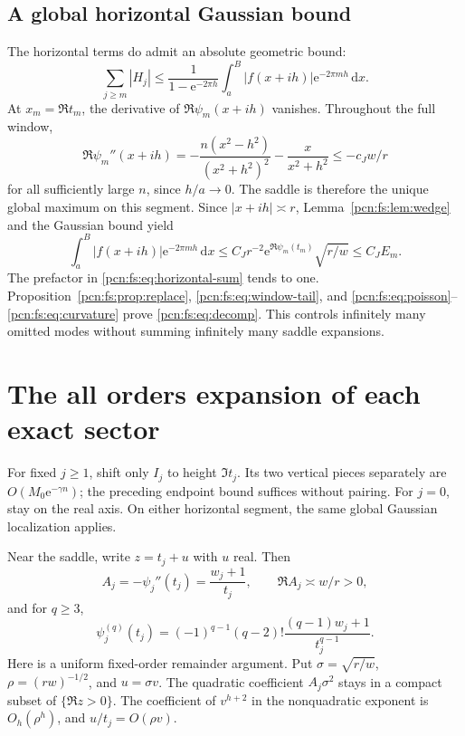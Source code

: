 \documentclass[11pt,letterpaper]{article}
\theoremstyle{remark}\newtheorem{remark}[theorem]{Remark}
\newcommand{\dd}{\,\mathrm d}
\newcommand{\ee}{\mathrm e}
\begin{document}
\subsection{A global horizontal Gaussian bound}
The horizontal terms do admit an absolute geometric bound:
\begin{equation}\label{pcn:fs:eq:horizontal-sum}
 \sum_{j\ge m}|H_j|
 \le\frac1{1-\ee^{-2\pi h}}
       \int_a^B|f(x+ih)|\ee^{-2\pi mh}\dd x.
\end{equation}
At $x_m=\Re t_m$, the derivative of $\Re\psi_m(x+ih)$ vanishes. Throughout the full window,
\begin{equation}\label{pcn:fs:eq:curvature}
 \Re\psi_m''(x+ih)
 =-\frac{n(x^2-h^2)}{(x^2+h^2)^2}
       -\frac{x}{x^2+h^2}\le-c_Jw/r
\end{equation}
for all sufficiently large $n$, since $h/a\to0$. The saddle is therefore the unique global maximum on this segment. Since $|x+ih|\asymp r$, Lemma~\ref{pcn:fs:lem:wedge} and the Gaussian bound yield
\[
 \int_a^B|f(x+ih)|\ee^{-2\pi mh}\dd x
 \le C_Jr^{-2}\ee^{\Re\psi_m(t_m)}\sqrt{r/w}
 \le C_JE_m.
\]
The prefactor in \eqref{pcn:fs:eq:horizontal-sum} tends to one. Proposition~\ref{pcn:fs:prop:replace}, \eqref{pcn:fs:eq:window-tail}, and \eqref{pcn:fs:eq:poisson}--\eqref{pcn:fs:eq:curvature} prove \eqref{pcn:fs:eq:decomp}. This controls infinitely many omitted modes without summing infinitely many saddle expansions.

\section{The all orders expansion of each exact sector}
For fixed $j\ge1$, shift only $I_j$ to height $\Im t_j$. Its two vertical pieces separately are $O(M_0\ee^{-\gamma n})$; the preceding endpoint bound suffices without pairing. For $j=0$, stay on the real axis. On either horizontal segment, the same global Gaussian localization applies.

Near the saddle, write $z=t_j+u$ with $u$ real. Then
\[
 A_j=-\psi_j''(t_j)=\frac{w_j+1}{t_j},\qquad
 \Re A_j\asymp w/r>0,
\]
and for $q\ge3$,
\begin{equation}\label{pcn:fs:eq:derivative-formula}
 \psi_j^{(q)}(t_j)=(-1)^{q-1}(q-2)!
                  \frac{(q-1)w_j+1}{t_j^{q-1}}.
\end{equation}
Here is a uniform fixed-order remainder argument. Put
$\sigma=\sqrt{r/w}$, $\rho=(rw)^{-1/2}$, and $u=\sigma v$.
The quadratic coefficient $A_j\sigma^2$ stays in a compact subset of $\{\Re z>0\}$. The coefficient of $v^{h+2}$ in the nonquadratic exponent is $O_h(\rho^h)$, and $u/t_j=O(\rho v)$.
\end{document}
